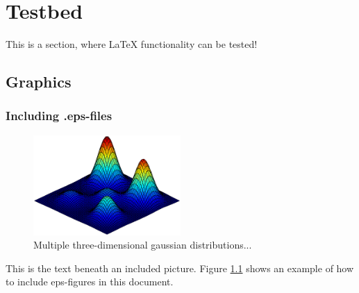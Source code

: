 \documentclass[12pt,twoside,a4paper]{report}
\begin{document}
\chapter[Testbed]{Testbed}
\label{chap:Testbed}
This is a section, where LaTeX functionality can be tested!
\section{Graphics}
\subsection{Including .eps-files}

\begin{figure}[H]
\centering
\includegraphics[width=0.5\textwidth]{data/plots/gmm/gaussian}
\caption{Multiple three-dimensional gaussian distributions...}
\label{fig:mog}
\end{figure}


This is the text beneath an included picture. Figure \ref{fig:mog} shows an example of how to include eps-figures in this document.

\end{document}

